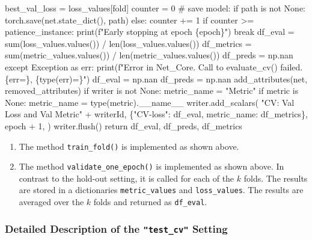\documentclass[
  letterpaper,
  DIV=11,
  numbers=noendperiod]{scrreprt}
\newenvironment{Shaded}{\begin{snugshade}}{\end{snugshade}}
\newcommand{\NormalTok}[1]{\textcolor[rgb]{0.00,0.23,0.31}{#1}}
\begin{document}
\begin{Shaded}
\begin{Highlighting}[]
\NormalTok{                    best\_val\_loss = loss\_values[fold]}
\NormalTok{                    counter = 0}
\NormalTok{                    \# save model:}
\NormalTok{                    if path is not None:}
\NormalTok{                        torch.save(net.state\_dict(), path)}
\NormalTok{                else:}
\NormalTok{                    counter += 1}
\NormalTok{                    if counter \textgreater{}= patience\_instance:}
\NormalTok{                        print(f"Early stopping at epoch \{epoch\}")}
\NormalTok{                        break}
\NormalTok{        df\_eval = sum(loss\_values.values()) / len(loss\_values.values())}
\NormalTok{        df\_metrics = sum(metric\_values.values()) / len(metric\_values.values())}
\NormalTok{        df\_preds = np.nan}
\NormalTok{    except Exception as err:}
\NormalTok{        print(f"Error in Net\_Core. Call to evaluate\_cv() failed. \{err=\}, }
\NormalTok{            \{type(err)=\}")}
\NormalTok{        df\_eval = np.nan}
\NormalTok{        df\_preds = np.nan}
\NormalTok{    add\_attributes(net, removed\_attributes)}
\NormalTok{    if writer is not None:}
\NormalTok{        metric\_name = "Metric"}
\NormalTok{        if metric is None:}
\NormalTok{            metric\_name = type(metric).\_\_name\_\_}
\NormalTok{        writer.add\_scalars(}
\NormalTok{            "CV: Val Loss and Val Metric" + writerId,}
\NormalTok{            \{"CV{-}loss": df\_eval, metric\_name: df\_metrics\},}
\NormalTok{            epoch + 1,}
\NormalTok{        )}
\NormalTok{        writer.flush()}
\NormalTok{    return df\_eval, df\_preds, df\_metrics}
\end{Highlighting}
\end{Shaded}

\begin{enumerate}
\def\labelenumi{\arabic{enumi}.}
\setcounter{enumi}{3}
\item
  The method \texttt{train\_fold()} is implemented as shown above.
\item
  The method \texttt{validate\_one\_epoch()} is implemented as shown
  above. In contrast to the hold-out setting, it is called for each of
  the \(k\) folds. The results are stored in a dictionaries
  \texttt{metric\_values} and \texttt{loss\_values}. The results are
  averaged over the \(k\) folds and returned as \texttt{df\_eval}.
\end{enumerate}

\subsubsection{\texorpdfstring{Detailed Description of the
\texttt{"test\_cv"}
Setting}{Detailed Description of the "test\_cv" Setting}}\label{detailed-description-of-the-test_cv-setting}
\end{document}
